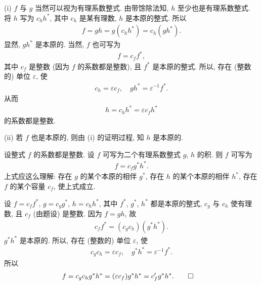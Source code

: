 \begin{pf}
    (i) $f$ 与 $g$ 当然可以视为有理系数整式. 由带馀除法知, $h$ 至少也是有理系数整式. 将 $h$ 写为 $c_h h^{\ast}$, 其中 $c_h$ 是某有理数, $h$ 是本原的整式. 所以
    \begin{align*}
        f = gh = g(c_h h^{\ast}) = c_h (g h^{\ast}).
    \end{align*}
    显然, $g h^{\ast}$ 是本原的. 当然, $f$ 也可写为
    \begin{align*}
        f = c_f f^{\ast},
    \end{align*}
    其中 $c_f$ 是整数 (因为 $f$ 的系数都是整数), 且 $f^{\ast}$ 是本原的整式. 所以, 存在 (整数的) 单位 $\varepsilon$, 使
    \begin{align*}
        c_h = \varepsilon c_f, \quad g h^{\ast} = \varepsilon^{-1} f^{\ast}.
    \end{align*}
    从而
    \begin{align*}
        h = c_h h^{\ast} = \varepsilon c_f h^{\ast}
    \end{align*}
    的系数都是整数.

    (ii) 若 $f$ 也是本原的, 则由 (i) 的证明过程, 知 $h$ 是本原的.
\end{pf}

\begin{proposition}
    设整式 $f$ 的系数都是整数. 设 $f$ 可写为二个有理系数整式 $g$, $h$ 的积. 则 $f$ 可写为
    \begin{align*}
        f = c_f g^{\ast} h^{\ast}.
    \end{align*}
    上式应这么理解: 存在 $g$ 的某个本原的相伴 $g^{\ast}$, 存在 $h$ 的某个本原的相伴 $h^{\ast}$, 存在 $f$ 的某个容量 $c_f$, 使上式成立.
\end{proposition}

\begin{pf}
    设 $f = c_f f^{\ast}$, $g = c_g g^{\ast}$, $h = c_h h^{\ast}$, 其中 $f^{\ast}$, $g^{\ast}$, $h^{\ast}$ 都是本原的整式, $c_g$ 与 $c_h$ 使有理数, 且 $c_f$ (由题设) 是整数. 因为 $f = gh$, 故
    \begin{align*}
        c_f f^{\ast} = (c_g c_h) (g^{\ast} h^{\ast}).
    \end{align*}
    $g^{\ast} h^{\ast}$ 是本原的. 所以, 存在 (整数的) 单位 $\varepsilon$, 使
    \begin{align*}
        c_g c_h = \varepsilon c_f, \quad g^{\ast} h^{\ast} = \varepsilon^{-1} f^{\ast}.
    \end{align*}
    所以
    \begin{align*}
         & f = c_g c_h g^{\ast} h^{\ast} = (\varepsilon c_f) g^{\ast} h^{\ast} = c_f^{\prime} g^{\ast} h^{\ast}. \qedhere
    \end{align*}
\end{pf}

